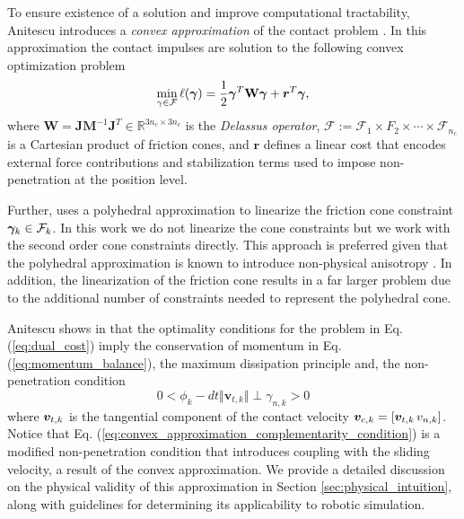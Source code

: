 To ensure existence of a solution and improve computational tractability,
Anitescu introduces a \textit{convex approximation} of the contact
problem \cite{bib:anitescu2006}. In this approximation the contact impulses are
solution to the following convex optimization problem
\begin{eqnarray}
	\min_{\gamma\in \mathcal{F}} \ell(\bgamma) =
	\frac{1}{2}\bgamma^T\mathbf{W}\bgamma + {\bm r}^T
	\bgamma,
	\label{eq:dual_cost}
\end{eqnarray}
where $\mathbf{W} =
\mathbf{J}\mathbf{M}^{-1}\mathbf{J}^T\in\mathbb{R}^{3n_c\times 3n_c}$ is the
\emph{Delassus operator}, $\mathcal{F} := \mathcal{F}_1 \times F_2 \times \cdots
\times \mathcal{F}_{n_c}$ is a Cartesian product of friction cones, and ${\bm
r}$ defines a linear cost  that encodes external force contributions and
stabilization terms used to impose non-penetration at the position level.

Further, \cite{bib:anitescu2006} uses a polyhedral approximation to linearize
the friction cone constraint ${\bm\gamma}_k\in\mathcal{F}_k$. In this work we do not
linearize the cone constraints but we work with the second order cone
constraints directly. This approach is preferred given that the polyhedral
approximation is known to introduce non-physical anisotropy
\cite{bib:li2018implicit}. In addition, the linearization of the friction cone
results in a far larger problem due to the additional number of constraints
needed to represent the polyhedral cone.

Anitescu shows in \cite{bib:anitescu2006} that the optimality conditions for the
problem in Eq. (\ref{eq:dual_cost}) imply the conservation of momentum in Eq.
(\ref{eq:momentum_balance}), the maximum dissipation principle and, the
non-penetration condition
\begin{equation}
	0 < \phi_k - dt \Vert {\bm v}_{t,k} \Vert \perp \gamma_{n,k} > 0
	\label{eq:convex_approximation_complementarity_condition}
\end{equation}
where ${\bm{v}}_{t,k}$ is the tangential component of the contact velocity
${\bm{v}}_{c,k} = [{\bm{v}}_{t,k}\,v_{n,k}]$. Notice that Eq.
(\ref{eq:convex_approximation_complementarity_condition}) is a modified
non-penetration condition that introduces coupling with the sliding velocity, a
result of the convex approximation. We provide a detailed discussion on the
physical validity of this approximation in Section \ref{sec:physical_intuition},
along with guidelines for determining its applicability to robotic simulation.

